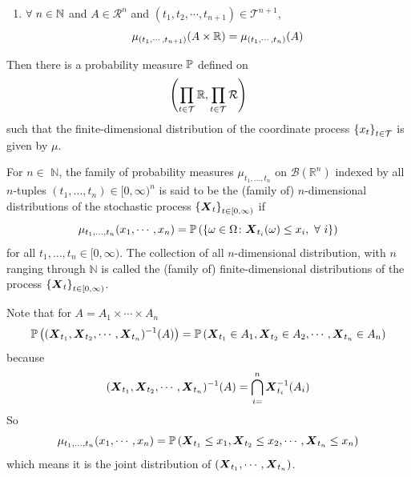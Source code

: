 \documentclass[a4paper,12pt]{article}
\begin{document}
\begin{itemize}
\begin{enumerate}[label=(\arabic*)]
\begin{enumerate}[label=(\roman*)]
      \item $\forall~n\in\mathbb{N}$ and $A \in \mathcal{R}^n$ and $(t_1,t_2,\cdots,t_{n+1}) \in \mathcal{T}^{n+1}$,
      \begin{equation*}
        \mu_{(t_1,\cdots,t_{n+1})}(A\times\mathbb{R}) = \mu_{(t_1,\cdots,t_n)}(A)
      \end{equation*}
    \end{enumerate}
    Then there is a probability measure $\mathbb{P}$ defined on
    \begin{equation*}
      \left(\prod_{t\in \mathcal{T}} \mathbb{R}, \prod_{t\in \mathcal{T}}\mathcal{R}\right)
    \end{equation*}
    such that the finite-dimensional distribution of the coordinate process $\left\{x_t\right\}_{t \in \mathcal{T}}$ is given by $\mu$.
    \begin{defn}
      For $n \in$ $\mathbb{N}$, the family of probability measures $\mu_{t_1, \ldots, t_n}$ on $\mathcal{B}\left(\mathbb{R}^n\right)$ indexed by all $n$-tuples $\left(t_1, \ldots, t_n\right) \in[0, \infty)^n$ is said to be the (family of) $n$-dimensional distributions of the stochastic process $\left\{\boldsymbol{X}_t\right\}_{t \in[0, \infty)}$ if
      \begin{equation*}
        \mu_{t_1, \ldots, t_n}(x_1,\cdots,x_n) = \mathbb{P}\left(\left\{\omega \in \Omega \colon \boldsymbol{X}_{t_i}(\omega) \leq x_i,~\forall~i\right\}\right)
      \end{equation*}
      for all $t_1, \ldots, t_n \in[0, \infty)$. The collection of all $n$-dimensional distribution, with $n$ ranging through $\mathbb{N}$ is called the (family of) finite-dimensional distributions of the process $\left\{\boldsymbol{X}_t\right\}_{t \in[0, \infty)}$.
    \end{defn}
    \begin{rmk}
      Note that for $A = A_1 \times \cdots \times A_n$
      \begin{equation*}
        \mathbb{P}\left((\boldsymbol{X}_{t_1},\boldsymbol{X}_{t_2},\cdots , \boldsymbol{X}_{t_n})^{-1}(A)\right) = \mathbb{P}\left(\boldsymbol{X}_{t_1}\in A_1,\boldsymbol{X}_{t_2}\in A_2,\cdots,\boldsymbol{X}_{t_n}\in A_n\right)
      \end{equation*}
      because
      \begin{equation*}
        (\boldsymbol{X}_{t_1},\boldsymbol{X}_{t_2},\cdots , \boldsymbol{X}_{t_n})^{-1}(A) = \bigcap_{i=}^n\boldsymbol{X}^{-1}_{t_i}(A_i)
      \end{equation*}
      So
      \begin{equation*}
        \mu_{t_1, \ldots, t_n}(x_1,\cdots,x_n) = \mathbb{P}\left(\boldsymbol{X}_{t_1}\leq x_1,\boldsymbol{X}_{t_2}\leq x_2,\cdots,\boldsymbol{X}_{t_n}\leq x_n\right)
      \end{equation*}
      which means it is the joint distribution of $\left(\boldsymbol{X}_{t_1},\cdots,\boldsymbol{X}_{t_n}\right)$.
    \end{rmk}


\end{enumerate}
\end{itemize}
\end{document}

